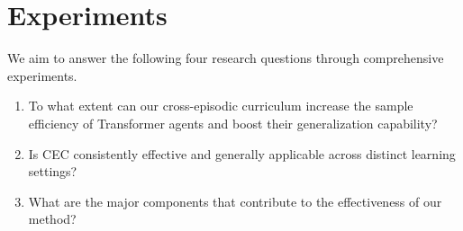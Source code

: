 \documentclass{article}
\begin{document}
\section{Experiments}
\label{sec:experiments}

We aim to answer the following four research questions through comprehensive experiments.
\begin{enumerate}
    \item{To what extent can our cross-episodic curriculum increase the sample efficiency of Transformer agents and boost their generalization capability?}
    \item{Is CEC consistently effective and generally applicable across distinct learning settings?}
    \item{What are the major components that contribute to the effectiveness of our method?}
\end{enumerate}
\vspace{-0.5em}
\end{document}

